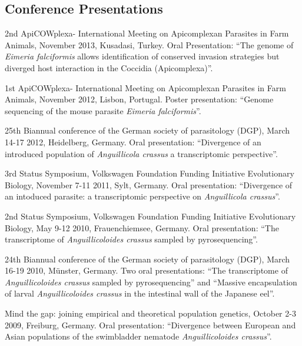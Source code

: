 \documentclass[10pt,a4paper]{article}
\renewenvironment{itemize}{
  \begin{list}{}{
    \setlength{\leftmargin}{2.5em}
    \setlength{\itemsep}{0.25em}
    \setlength{\parskip}{0pt}
    \setlength{\parsep}{0.25em}
  }
}{
  \end{list}
}
\begin{document}
\subsection*{Conference Presentations}

\begin{itemize}


\item 2nd ApiCOWplexa- International Meeting on Apicomplexan Parasites
  in Farm Animals, November 2013, Kusadasi, Turkey. Oral Presentation:
  ``The genome of \textit{Eimeria falciformis} allows identification of
  conserved invasion strategies but diverged host interaction in the
  Coccidia (Apicomplexa)''. 
  
\item 1st ApiCOWplexa- International Meeting on Apicomplexan Parasites
  in Farm Animals, November 2012, Lisbon, Portugal. Poster
  presentation: ``Genome sequencing of the mouse parasite \textit{Eimeria
  falciformis}''.

\item 25th Biannual conference of the German society of parasitology
  (DGP), March 14-17 2012, Heidelberg, Germany. Oral presentation:
  ``Divergence of an introduced population of \textit{Anguillicola
    crassus} a transcriptomic perspective''.

\item 3rd Status Symposium, Volkswagen Foundation Funding Initiative
  Evolutionary Biology, November 7-11 2011, Sylt, Germany. Oral
  presentation: ``Divergence of an intoduced parasite: a
  transcriptomic perspective on \textit{Anguillicola crassus}''.

\item 2nd Status Symposium, Volkswagen Foundation Funding Initiative
  Evolutionary Biology, May 9-12 2010, Frauenchiemsee, Germany. Oral
  presentation: ``The transcriptome of \textit{Anguillicoloides
    crassus} sampled by pyrosequencing''.

\item 24th Biannual conference of the German society of parasitology
  (DGP), March 16-19 2010, M\"unster, Germany. Two oral presentations:
  ``The transcriptome of \textit{Anguillicoloides crassus} sampled by
  pyrosequencing'' and ``Massive encapsulation of larval
  \textit{Anguillicoloides crassus} in the intestinal wall of the
  Japanese eel''.

\item Mind the gap: joining empirical and theoretical population
  genetics, October 2-3 2009, Freiburg, Germany. Oral presentation:
  ``Divergence between European and Asian populations of the
  swimbladder nematode \textit{Anguillicoloides crassus}''.


\end{itemize}
\end{document}
